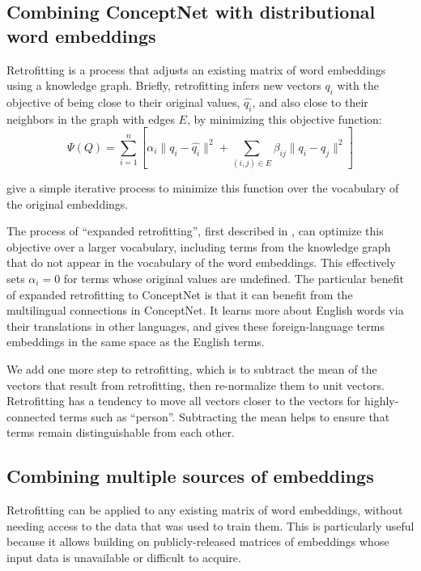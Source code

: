 \documentclass[letterpaper]{article}
\begin{document}
\subsection{Combining ConceptNet with distributional word embeddings}

Retrofitting \cite{faruqui2015retrofitting} is a process that adjusts an
existing matrix of word embeddings using a knowledge graph. Briefly, retrofitting
infers new vectors $q_i$ with the objective of being close to their original
values, $\hat{q_i}$, and also close to their neighbors in the graph with edges $E$,
by minimizing this objective function:
$$\Psi(Q) = \sum_{i=1}^{n}\left[
    \alpha_i \lVert q_i - \hat{q_i} \rVert ^2 + \sum_{(i, j) \in E} \beta_{ij} \lVert q_i - q_j \rVert ^2
\right] $$

\citeauthor{faruqui2015retrofitting} give a simple iterative process to minimize
this function over the vocabulary of the original embeddings.

The process of ``expanded retrofitting'', first described in
\cite{speer2016ensemble}, can optimize this objective over a larger vocabulary,
including terms from the knowledge graph that do not appear in the vocabulary
of the word embeddings. This effectively sets $\alpha_i = 0$ for terms whose
original values are undefined. The particular benefit of expanded retrofitting
to ConceptNet is that it can benefit from the multilingual connections in
ConceptNet. It learns more about English words via their translations in other
languages, and gives these foreign-language terms embeddings in the same space
as the English terms.

We add one more step to retrofitting, which is to subtract the mean of the
vectors that result from retrofitting, then re-normalize them to unit vectors.
Retrofitting has a tendency to move all vectors closer to the vectors for
highly-connected terms such as ``person''. Subtracting the mean helps to ensure
that terms remain distinguishable from each other.

\subsection{Combining multiple sources of embeddings}

Retrofitting can be applied to any existing matrix of word embeddings, without
needing access to the data that was used to train them. This is particularly
useful because it allows building on publicly-released matrices of embeddings
whose input data is unavailable or difficult to acquire.
\end{document}

